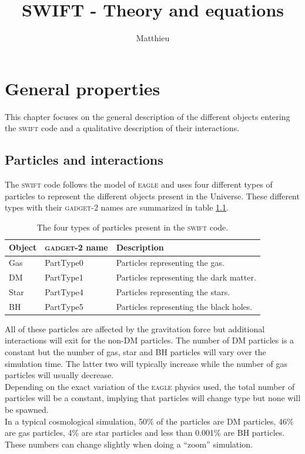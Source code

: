 \documentclass[a4paper,10pt]{report}
\title{SWIFT - Theory and equations}
\author{Matthieu}
\newcommand{\swift}{\textsc{swift }}
\newcommand{\eagle}{\textsc{eagle }}
\newcommand{\gadget}{\textsc{gadget-2 }}
\begin{document}
\maketitle





\chapter{General properties}
\label{chap:intro}

This chapter focuses on the general description of the different objects entering the \swift code and a qualitative
description of their interactions.

\section{Particles and interactions}

The \swift code follows the model of \eagle and uses four different types of particles to represent the different
objects present in the Universe. These different types with their \gadget names are summarized in table
\ref{tab:parttypes}.

\begin{table}[h]
\centering

\begin{tabular}{|l|l|l|}
\hline
\textbf{Object} & \textbf{\gadget name} & \textbf{Description} \\
\hline
Gas & PartType0 & Particles representing the gas.\\
DM & PartType1 & Particles representing the dark matter.\\
Star & PartType4 & Particles representing the stars.\\
BH & PartType5 & Particles representing the black holes.\\
\hline
\end{tabular}
\caption{\label{tab:parttypes}The four types of particles present in the \swift code.}
\end{table}

All of these particles are affected by the gravitation force but additional interactions will exit for the non-DM
particles. The number of DM particles is a constant but the number of gas, star and BH particles will vary
over the simulation time. The latter two will typically increase while the number of gas particles will usually
decrease. \\
Depending on the exact variation of the \eagle physics used, the total number of particles will be a
constant, implying that particles will change type but none will be spawned. \\
In a typical cosmological simulation, 50\% of the particles are DM particles, 46\% are gas particles, 4\% are star
particles and less than 0.001\% are BH particles. These numbers can change slightly when doing a ``zoom'' simulation.\\
\end{document}
